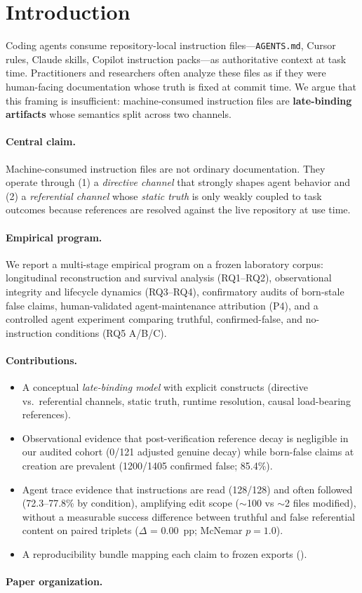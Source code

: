 \section{Introduction}
\label{sec:introduction}

Coding agents consume repository-local instruction files---\texttt{AGENTS.md}, Cursor rules, Claude skills, Copilot instruction packs---as authoritative context at task time.
Practitioners and researchers often analyze these files as if they were human-facing documentation whose truth is fixed at commit time.
We argue that this framing is insufficient: machine-consumed instruction files are \textbf{late-binding artifacts} whose semantics split across two channels.

\paragraph{Central claim.}
Machine-consumed instruction files are not ordinary documentation.
They operate through (1) a \emph{directive channel} that strongly shapes agent behavior and (2) a \emph{referential channel} whose \emph{static truth} is only weakly coupled to task outcomes because references are resolved against the live repository at use time.

\paragraph{Empirical program.}
We report a multi-stage empirical program on a frozen laboratory corpus:
longitudinal reconstruction and survival analysis (RQ1--RQ2),
observational integrity and lifecycle dynamics (RQ3--RQ4),
confirmatory audits of born-stale false claims,
human-validated agent-maintenance attribution (P4),
and a controlled agent experiment comparing truthful, confirmed-false, and no-instruction conditions (RQ5 A/B/C).

\paragraph{Contributions.}
\begin{itemize}
  \item A conceptual \emph{late-binding model} with explicit constructs (directive vs.\ referential channels, static truth, runtime resolution, causal load-bearing references).
  \item Observational evidence that post-verification reference decay is negligible in our audited cohort (0/121 adjusted genuine decay) while born-false claims at creation are prevalent (1200/1405 confirmed false; 85.4\%).
  \item Agent trace evidence that instructions are read (128/128) and often followed (72.3--77.8\% by condition), amplifying edit scope ($\sim$100 vs $\sim$2 files modified), without a measurable success difference between truthful and false referential content on paired triplets ($\Delta$ = 0.00~pp; McNemar $p = 1.0$).
  \item A reproducibility bundle mapping each claim to frozen exports ().
\end{itemize}

\paragraph{Paper organization.}
